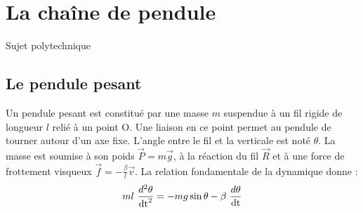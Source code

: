 \section{La chaîne de pendule}

\label{soliton-sujet}

Sujet polytechnique \cite{soliton-sujet}
\subsection{Le pendule pesant}
\begin{multicols}{2}%

\columnbreak
Un pendule pesant est constitué par une masse $m$ suspendue à un fil rigide de longueur $l$ relié à un point O. Une liaison en ce point permet au pendule de tourner autour d'un axe fixe. L'angle entre le fil et la verticale est noté $\theta$. La masse est soumise à son poids $\overrightarrow{P}=m\overrightarrow{g}$, à la réaction du fil $\overrightarrow{R}$ et à une force de frottement visqueux $\overrightarrow{f}= - \frac{\beta}{l} \overrightarrow{v}$. La relation fondamentale de la dynamique donne :
\[
m l\ \frac{d^2 \theta}{\operatorname{dt}^2} =  - m g \sin{\theta}  -  \beta\ \frac{d \theta}{\operatorname{dt}}
\]
\end{multicols}
%
